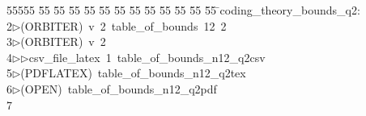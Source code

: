 %
%
\begin{tabbing}
55555 \= 55 \= 55 \= 55 \= 55 \= 55 \= 55 \= 55 \= 55 \= 55 \= 55 \= 55 \= 55 \= \>coding\_theory\_bounds\_q2:\\[0pt]
2\>$\triangleright$\>(ORBITER)\ v\ 2\ table\_of\_bounds\ 12\ 2\\[0pt]
3\>$\triangleright$\>(ORBITER)\ v\ 2\ \\[0pt]
4\>$\triangleright$\>$\triangleright$\>csv\_file\_latex\ 1\ table\_of\_bounds\_n12\_q2csv\\[0pt]
5\>$\triangleright$\>(PDFLATEX)\ table\_of\_bounds\_n12\_q2tex\\[0pt]
6\>$\triangleright$\>(OPEN)\ table\_of\_bounds\_n12\_q2pdf\\[0pt]
7\>\end{tabbing}
